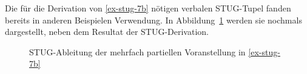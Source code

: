 Die für die Derivation von \ref{ex-stug-7b} nötigen verbalen STUG-Tupel fanden bereits in anderen Beispielen Verwendung. In Abbildung~\ref{fig-stug-13} werden sie nochmals dargestellt, neben dem Resultat der STUG-Derivation.   
\begin{figure}[t]
\centering
{}
\caption{\label{fig-stug-13} STUG-Ableitung der mehrfach partiellen Voranstellung in \ref{ex-stug-7b}}
\end{figure}
